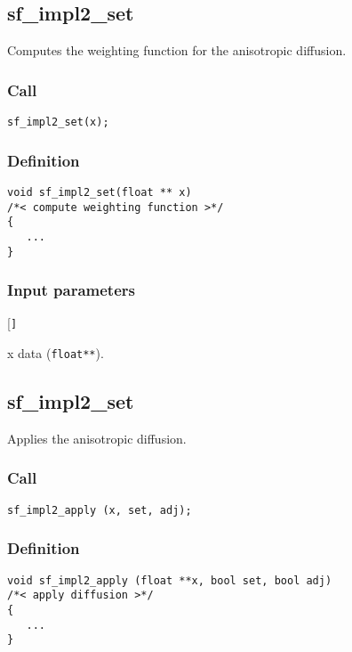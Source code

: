 \subsection{{sf\_impl2\_set}}
Computes the weighting function for the anisotropic diffusion.

\subsubsection*{Call}
\begin{verbatim}sf_impl2_set(x);\end{verbatim}

\subsubsection*{Definition}
\begin{verbatim}
void sf_impl2_set(float ** x)
/*< compute weighting function >*/
{
   ...
}
\end{verbatim}

\subsubsection*{Input parameters}
\begin{desclist}{\tt }{\quad}[\tt ]
   \setlength\itemsep{0pt}
   \item[x] data (\texttt{float**}).  
\end{desclist}




\subsection{{sf\_impl2\_set}}
Applies the anisotropic diffusion.

\subsubsection*{Call}
\begin{verbatim}sf_impl2_apply (x, set, adj);\end{verbatim}

\subsubsection*{Definition}
\begin{verbatim}
void sf_impl2_apply (float **x, bool set, bool adj)
/*< apply diffusion >*/
{
   ...  
}
\end{verbatim}

